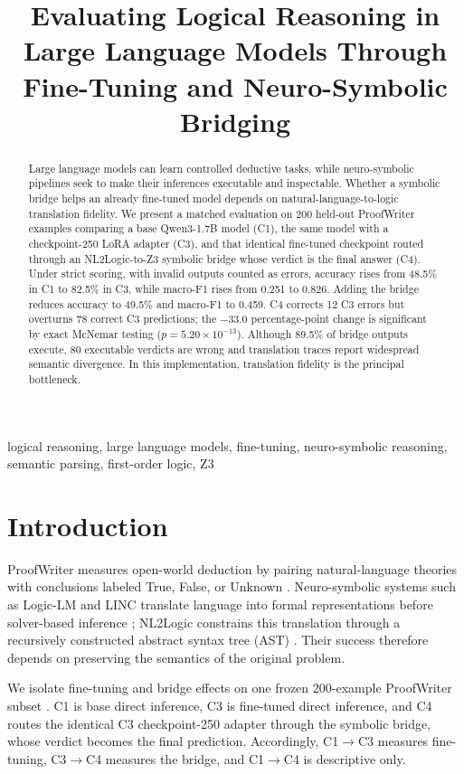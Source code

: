 \documentclass[conference]{IEEEtran}
\title{Evaluating Logical Reasoning in Large Language Models Through Fine-Tuning and Neuro-Symbolic Bridging}
\author{\IEEEauthorblockN{Anonymous Author(s)}
\IEEEauthorblockA{Anonymous submission}}
\begin{document}
\maketitle

\begin{abstract}
Large language models can learn controlled deductive tasks, while neuro-symbolic pipelines seek to make their inferences executable and inspectable. Whether a symbolic bridge helps an already fine-tuned model depends on natural-language-to-logic translation fidelity. We present a matched evaluation on 200 held-out ProofWriter examples comparing a base Qwen3-1.7B model (C1), the same model with a checkpoint-250 LoRA adapter (C3), and that identical fine-tuned checkpoint routed through an NL2Logic-to-Z3 symbolic bridge whose verdict is the final answer (C4). Under strict scoring, with invalid outputs counted as errors, accuracy rises from 48.5\% in C1 to 82.5\% in C3, while macro-F1 rises from 0.251 to 0.826. Adding the bridge reduces accuracy to 49.5\% and macro-F1 to 0.459. C4 corrects 12 C3 errors but overturns 78 correct C3 predictions; the $-33.0$ percentage-point change is significant by exact McNemar testing ($p=5.20\times10^{-13}$). Although 89.5\% of bridge outputs execute, 80 executable verdicts are wrong and translation traces report widespread semantic divergence. In this implementation, translation fidelity is the principal bottleneck.
\end{abstract}

\begin{IEEEkeywords}
logical reasoning, large language models, fine-tuning, neuro-symbolic reasoning, semantic parsing, first-order logic, Z3
\end{IEEEkeywords}

\section{Introduction}
ProofWriter measures open-world deduction by pairing natural-language theories with conclusions labeled True, False, or Unknown \cite{tafjord2021proofwriter}. Neuro-symbolic systems such as Logic-LM and LINC translate language into formal representations before solver-based inference \cite{pan2023logiclm,olausson2023linc}; NL2Logic constrains this translation through a recursively constructed abstract syntax tree (AST) \cite{putra2026nl2logic}. Their success therefore depends on preserving the semantics of the original problem.

We isolate fine-tuning and bridge effects on one frozen 200-example ProofWriter subset \cite{tafjord2021proofwriter}. C1 is base direct inference, C3 is fine-tuned direct inference, and C4 routes the identical C3 checkpoint-250 adapter through the symbolic bridge, whose verdict becomes the final prediction. Accordingly, C1$\rightarrow$C3 measures fine-tuning, C3$\rightarrow$C4 measures the bridge, and C1$\rightarrow$C4 is descriptive only.
\end{document}
